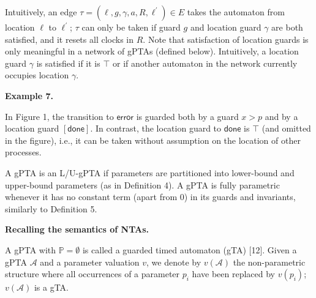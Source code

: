  
  
 
 
 
Intuitively, an edge $\tau=(\mathrm{\ell},g,\gamma,a,R,\mathrm{\ell}^{\prime})\in E$ takes the automaton from location $\mathrm{\ell}$ to $\mathrm{\ell}^{\prime}$; $\tau$ can only be taken if guard $g$ and location guard $\gamma$ are both satisfied, and it resets all clocks in $R$. Note that satisfaction of location guards is only meaningful in a network of gPTAs (defined below). Intuitively, a location guard $\gamma$ is satisfied if it is $\top$ or if another automaton in the network currently occupies location $\gamma$.\par
 
 
 
\par\medskip\noindent\textbf{Example 7.}\par
 
 
In Figure 1, the transition to $\mathsf{error}$ is guarded both by a guard $x>p$ and by a location guard $[\mathsf{done}]$. In contrast, the location guard to $\mathsf{done}$ is $\top$ (and omitted in the figure), i.e., it can be taken without assumption on the location of other processes.\par
 
 
 
 
A gPTA is an L/U-gPTA if parameters are partitioned into lower-bound and upper-bound parameters (as in Definition 4). A gPTA is fully parametric whenever it has no constant term (apart from 0) in its guards and invariants, similarly to Definition 5.\par
 
 
 
\par\medskip\noindent\textbf{Recalling the semantics of NTAs.}\par
 
 
A gPTA with $\mathbb{P}=\emptyset$ is called a guarded timed automaton (gTA) [12]. Given a gPTA $\mathcal{A}$ and a parameter valuation $v$, we denote by $v(\mathcal{A})$ the non-parametric structure where all occurrences of a parameter $p_{i}$ have been replaced by $v(p_{i})$; $v(\mathcal{A})$ is a gTA.\par
 
